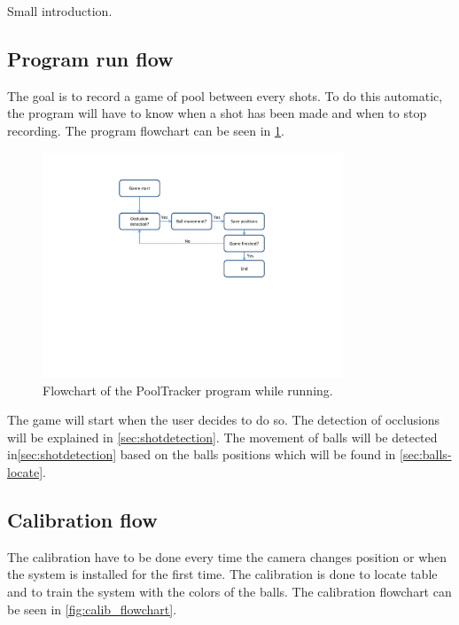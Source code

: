 Small introduction.\\

\subsection{Program run flow}
The goal is to record a game of pool between every shots. To do this automatic, the program will have to know when a shot has been made and when to stop recording. The program flowchart can be seen in \ref{fig:program_flowchart}.\\

\begin{figure}[H]
\begin{center}
\leavevmode
\includegraphics[width=0.8\textwidth]{images/program_flowchart}
\end{center}
\caption{Flowchart of the PoolTracker program while running.}
\label{fig:program_flowchart}
\end{figure}

The game will start when the user decides to do so. The detection of occlusions will be explained in \ref{sec:shotdetection}. The movement of balls will be detected in\ref{sec:shotdetection} based on the balls positions which will be found in \ref{sec:balls-locate}.

\subsection{Calibration flow}
The calibration have to be done every time the camera changes position or when the system is installed for the first time. The calibration is done to locate table and to train the system with the colors of the balls. The calibration flowchart can be seen in \ref{fig:calib_flowchart}.\\

